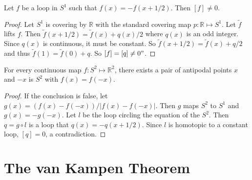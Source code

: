 \documentclass[12pt]{book}
\begin{document}
\begin{lemma}
	Let $f$ be a loop in $S^1$ such that $f(x)=-f(x+1/2)$. Then $[f]\neq 0$.
\end{lemma}
\begin{proof}
	Let $S^1$ is covering by $\mathbb R$ with the standard covering map $p:\mathbb R\mapsto S^1$. Let $\tilde f$ lifts $f$. Then $\tilde f(x+1/2)=\tilde f(x)+q(x)/2$ where $q(x)$ is an odd integer. Since $q(x)$ is continuous, it must be constant. So $\tilde f(x+1/2)=\tilde f(x)+q/2$ and thus $\tilde f(1)=\tilde f(0)+q$. So $[f]=[q]\neq0"$.
\end{proof}

\begin{theorem}
	For every continuous map $f:S^2\mapsto \mathbb R^2$, there exists a pair of antipodal points $x$ and $-x$ is $S^2$ with $f(x)=f(-x)$.
\end{theorem}

\begin{proof}
	If the conclusion is false, let $g(x)=(f(x)-f(-x))/|f(x)-f(-x)|$. Then $g$ maps $S^2$ to $S^1$ and $g(x)=-g(-x)$. Let $l$ be the loop circling the equation of the $S^2$. Then $q=g\circ l$ is a loop that $q(x)=-q(x+1/2)$. Since $l$ is homotopic to a constant loop, $[q]=0$, a contradiction.
\end{proof}

\section{The van Kampen Theorem}
\end{document}
